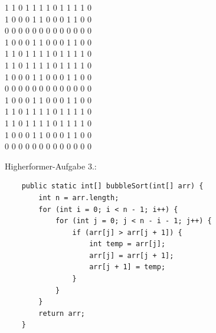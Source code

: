 \documentclass{../../sheet}
\begin{document}
\begin{ausgabe}
    1 1 0 1 1 1 1 0 1 1 1 1 0 \\
    1 0 0 0 1 1 0 0 0 1 1 0 0 \\
    0 0 0 0 0 0 0 0 0 0 0 0 0 \\
    1 0 0 0 1 1 0 0 0 1 1 0 0 \\
    1 1 0 1 1 1 1 0 1 1 1 1 0 \\
    1 1 0 1 1 1 1 0 1 1 1 1 0 \\
    1 0 0 0 1 1 0 0 0 1 1 0 0 \\
    0 0 0 0 0 0 0 0 0 0 0 0 0 \\
    1 0 0 0 1 1 0 0 0 1 1 0 0 \\
    1 1 0 1 1 1 1 0 1 1 1 1 0 \\
    1 1 0 1 1 1 1 0 1 1 1 1 0 \\
    1 0 0 0 1 1 0 0 0 1 1 0 0 \\
    0 0 0 0 0 0 0 0 0 0 0 0 0
\end{ausgabe}
\newpage
\hypertarget{Highperformer}{}
Higherformer-Aufgabe 3.:
\begin{verbatim}
    public static int[] bubbleSort(int[] arr) {
        int n = arr.length;
        for (int i = 0; i < n - 1; i++) {
            for (int j = 0; j < n - i - 1; j++) {
                if (arr[j] > arr[j + 1]) {
                    int temp = arr[j];
                    arr[j] = arr[j + 1];
                    arr[j + 1] = temp;
                }
            }
        }
        return arr;
    }
    \end{verbatim}
\end{document}
